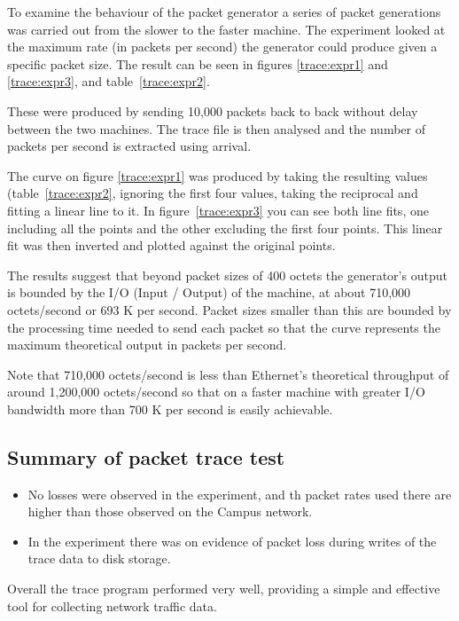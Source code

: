 To examine the behaviour of the packet generator a series of packet
generations was carried out from the slower to the faster machine.
The experiment looked at the maximum rate (in packets per second) the
generator could produce given a specific packet size.  The result can
be seen in figures \ref{trace:expr1} and \ref{trace:expr3}, and
table~\ref{trace:expr2}.

These were produced by sending 10,000 packets back to back without
delay between the two machines.  The trace file is then analysed and
the number of packets per second is extracted using {\ttfamily arrival}.

The curve on figure \ref{trace:expr1} was produced by taking the
resulting values (table~\ref{trace:expr2}, ignoring the first four
values, taking the reciprocal and fitting a linear line to it.  In
figure~\ref{trace:expr3} you can see both line fits, one including all
the points and the other excluding the first four points.  This linear
fit was then inverted and plotted against the original points.

The results suggest that beyond packet sizes of 400 octets the
generator's output is bounded by the I/O (Input / Output) of the
machine, at about 710,000 octets/second or 693 K per second.  Packet
sizes smaller than this are bounded by the processing time needed to
send each packet so that the curve represents the maximum theoretical
output in packets per second.

Note that 710,000 octets/second is less than Ethernet's theoretical
throughput of around 1,200,000 octets/second so that on a faster
machine with greater I/O bandwidth more than 700 K per second is
easily achievable.

\subsection{Summary of packet trace test}

\begin{itemize}

\item
No losses were observed in the experiment, and th packet rates used
there are higher than those observed on the Campus network.

\item
In the experiment there was on evidence of packet loss during writes
of the trace data to disk storage.

\end{itemize}

Overall the trace program performed very well, providing a simple and
effective tool for collecting network traffic data.
